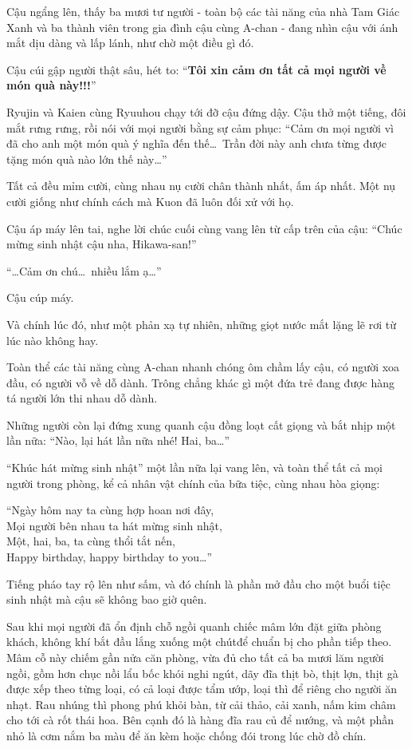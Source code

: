 \documentclass[../main.tex]{subfiles}
\begin{document}
Cậu ngẩng lên, thấy ba mươi tư người - toàn bộ các tài năng của nhà Tam Giác Xanh và ba thành viên trong gia đình cậu cùng A-chan - đang nhìn cậu với ánh mắt dịu dàng và lấp lánh, như chờ một điều gì đó.

Cậu cúi gập người thật sâu, hét to: ``\textbf{Tôi xin cảm ơn tất cả mọi người về món quà này!!!}''

Ryujin và Kaien cùng Ryuuhou chạy tới đỡ cậu đứng dậy. Cậu thở một tiếng, đôi mắt rưng rưng, rồi nói với mọi người bằng sự cảm phục: ``Cảm ơn mọi người vì đã cho anh một món quà ý nghĩa đến thế\dots\ Trần đời này anh chưa từng được tặng món quà nào lớn thế này\dots''

Tất cả đều mỉm cười, cùng nhau nụ cười chân thành nhất, ấm áp nhất. Một nụ cười giống như chính cách mà Kuon đã luôn đối xử với họ.

Cậu áp máy lên tai, nghe lời chúc cuối cùng vang lên từ cấp trên của cậu: ``Chúc mừng sinh nhật cậu nha, Hikawa-san!''

``\dots Cảm ơn chú\dots\ nhiều lắm ạ\dots''

Cậu cúp máy.

Và chính lúc đó, như một phản xạ tự nhiên, những giọt nước mắt lặng lẽ rơi từ lúc nào không hay.

Toàn thể các tài năng cùng A-chan nhanh chóng ôm chầm lấy cậu, có người xoa đầu, có người vỗ về dỗ dành. Trông chẳng khác gì một đứa trẻ đang được hàng tá người lớn thi nhau dỗ dành.

Những người còn lại đứng xung quanh cậu đồng loạt cất giọng và bắt nhịp một lần nữa: ``Nào, lại hát lần nữa nhé! Hai, ba\dots''

``Khúc hát mừng sinh nhật'' một lần nữa lại vang lên, và toàn thể tất cả mọi người trong phòng, kể cả nhân vật chính của bữa tiệc, cùng nhau hòa giọng:

\tabs[4cm] ``Ngày hôm nay ta cùng hợp hoan nơi đây, \\
\tabs[4cm] Mọi người bên nhau ta hát mừng sinh nhật, \\
\tabs[4cm] Một, hai, ba, ta cùng thổi tắt nến, \\
\tabs[4cm] Happy birthday, happy birthday to you\dots''

Tiếng pháo tay rộ lên như sấm, và đó chính là phần mở đầu cho một buổi tiệc sinh nhật mà cậu sẽ không bao giờ quên.

\ct

Sau khi mọi người đã ổn định chỗ ngồi quanh chiếc mâm lớn đặt giữa phòng khách, không khí bắt đầu lắng xuống một chútđể chuẩn bị cho phần tiếp theo. Mâm cỗ này chiếm gần nửa căn phòng, vừa đủ cho tất cả ba mươi lăm người ngồi, gồm hơn chục nồi lẩu bốc khói nghi ngút, dãy đĩa thịt bò, thịt lợn, thịt gà được xếp theo từng loại, có cả loại được tẩm ướp, loại thì để riêng cho người ăn nhạt. Rau nhúng thì phong phú khỏi bàn, từ cải thảo, cải xanh, nấm kim châm cho tới cà rốt thái hoa. Bên cạnh đó là hàng đĩa rau củ để nướng, và một phần nhỏ là cơm nắm ba màu để ăn kèm hoặc chống đói trong lúc chờ đồ chín.
\end{document}
